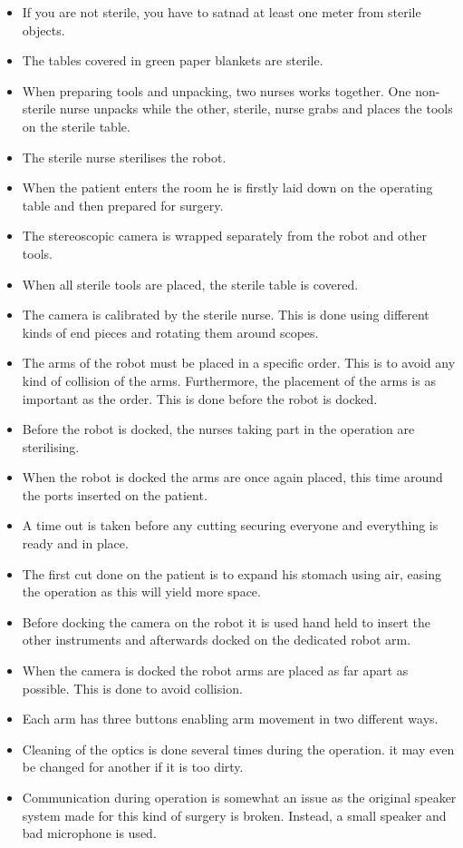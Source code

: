 \documentclass[paper=a4, fontsize=11pt]{scrartcl} %
\numberwithin{equation}{section} %
\numberwithin{figure}{section} %
\numberwithin{table}{section} %
\begin{document}
\begin{itemize}
	\item If you are not sterile, you have to satnad at least one meter from sterile objects.
	\item The tables covered in green paper blankets are sterile.
	\item When preparing tools and unpacking, two nurses works together. One non-sterile nurse unpacks while the other, sterile, nurse grabs and places the tools on the sterile table.
	\item The sterile nurse sterilises the robot.
	\item When the patient enters the room he is firstly laid down on the operating table and then prepared for surgery.
	\item The stereoscopic camera is wrapped separately from the robot and other tools.
	\item When all sterile tools are placed, the sterile table is covered.
	\item The camera is calibrated by the sterile nurse. This is done using different kinds of end pieces and rotating them around scopes.
	\item The arms of the robot must be placed in a specific order. This is to avoid any kind of collision of the arms. Furthermore, the placement of the arms is as important as the order. This is done before the robot is docked.
	\item  Before the robot is docked, the nurses taking part in the operation are sterilising.
	\item When the robot is docked the arms are once again placed, this time around the ports inserted on the patient.
	\item A time out is taken before any cutting securing everyone and everything is ready and in place.
	\item The first cut done on the patient is to expand his stomach using air, easing the operation as this will yield more space.
	\item Before docking the camera on the robot it is used hand held to insert the other instruments and afterwards docked on the dedicated robot arm.
	\item When the camera is docked the robot arms are placed as far apart as possible. This is done to avoid collision.
	\item Each arm has three buttons enabling arm movement in two different ways.
	\item Cleaning of the optics is done several times during the operation. it may even be changed for another if it is too dirty.
	\item Communication during operation is somewhat an issue as the original speaker system made for this kind of surgery is broken. Instead, a small speaker and bad microphone is used.
\end{itemize}
\end{document}
